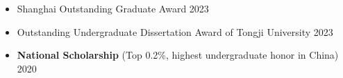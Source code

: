 \begin{rSection}



    \begin{itemize}
        \item \small {Shanghai Outstanding Graduate Award} \hfill 2023
            \vspace{-1mm}

        \item \small {Outstanding Undergraduate Dissertation Award of
            Tongji University} \hfill 2023
            \vspace{-1mm}

        \item \small \textbf{National Scholarship} (Top 0.2\%, highest undergraduate
            honor in China) \hfill 2020
            \vspace{-1mm}
    \end{itemize}
\vspace{-2mm}
\end{rSection}